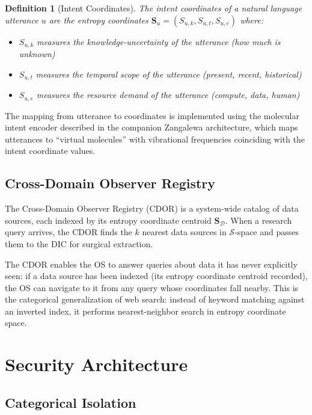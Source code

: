 \documentclass[12pt,twocolumn]{article}
\newtheorem{definition}{Definition}[section]
\begin{document}
\begin{definition}[Intent Coordinates]
The intent coordinates of a natural language utterance $u$ are the entropy coordinates $\mathbf{S}_u = (S_{u,k}, S_{u,t}, S_{u,e})$ where:
\begin{itemize}
\item $S_{u,k}$ measures the knowledge-uncertainty of the utterance (how much is unknown)
\item $S_{u,t}$ measures the temporal scope of the utterance (present, recent, historical)
\item $S_{u,e}$ measures the resource demand of the utterance (compute, data, human)
\end{itemize}
\end{definition}

The mapping from utterance to coordinates is implemented using the molecular intent encoder described in the companion Zangalewa architecture, which maps utterances to ``virtual molecules'' with vibrational frequencies coinciding with the intent coordinate values.

\subsection{Cross-Domain Observer Registry}

The Cross-Domain Observer Registry (CDOR) is a system-wide catalog of data sources, each indexed by its entropy coordinate centroid $\mathbf{S}_{\mathcal{D}}$. When a research query arrives, the CDOR finds the $k$ nearest data sources in $\mathcal{S}$-space and passes them to the DIC for surgical extraction.

The CDOR enables the OS to answer queries about data it has never explicitly seen: if a data source has been indexed (its entropy coordinate centroid recorded), the OS can navigate to it from any query whose coordinates fall nearby. This is the categorical generalization of web search: instead of keyword matching against an inverted index, it performs nearest-neighbor search in entropy coordinate space.

\section{Security Architecture}
\label{sec:security}

\subsection{Categorical Isolation}
\end{document}

